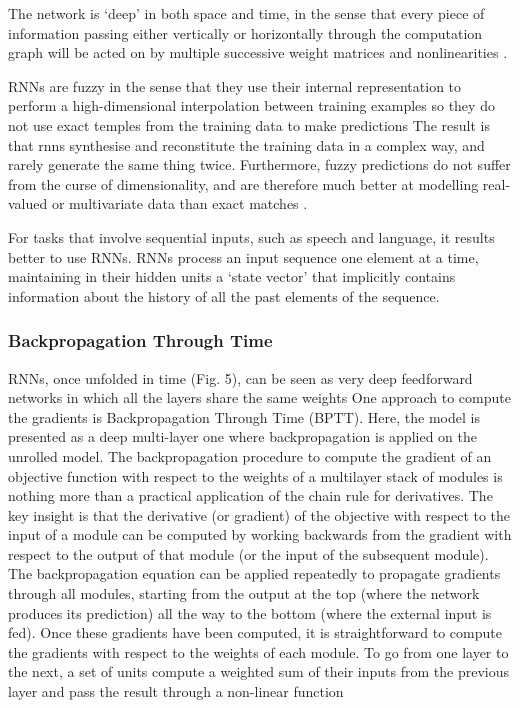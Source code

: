The network is `deep' in both space and time, in the sense that every piece of information passing either vertically or horizontally through the computation graph will be acted on by multiple successive weight matrices and nonlinearities \cite{graves2013generating}.

RNNs are fuzzy in the sense that they use their internal representation to perform a high-dimensional interpolation between training examples so they do not use exact temples from the training data to make predictions \cite{graves2013generating}
The result is that rnns synthesise and reconstitute the training data in a complex way, and rarely generate the same thing twice. Furthermore, fuzzy predictions do not suffer from the curse of dimensionality, and are therefore much better at modelling real-valued or multivariate data than exact matches  \cite{graves2013generating}.

For tasks that involve sequential inputs, such as speech and language, it results better to use RNNs. RNNs process an input sequence one element at a time, maintaining in their hidden units a ‘state vector’ that implicitly contains information about the history of all the past elements of the sequence.\cite{lecun2015deep}


\subsubsection{Backpropagation Through Time}

RNNs, once unfolded in time (Fig. 5), can be seen as very deep feedforward networks in which all the layers share the same weights\cite{lecun2015deep}
One approach to compute the gradients is Backpropagation Through Time (BPTT). Here, the model is presented as a deep multi-layer one where backpropagation is applied on the unrolled model\cite{pascanu2013difficulty}.
The backpropagation procedure to compute the gradient of an objective function with respect to the weights of a multilayer stack of modules is nothing more than a practical application of the chain rule for derivatives. The key insight is that the derivative (or gradient)
of the objective with respect to the input of a module can be computed by working backwards from the gradient with respect to the output of that module (or the input of the subsequent module). The backpropagation equation can be applied repeatedly to propagate gradients through all modules, starting from the output at the top (where the network produces its prediction) all the way to the bottom (where the external input is fed). Once these gradients have been computed, it is straightforward to compute the gradients with respect to the weights of each module. To go from one layer to the next, a set of units compute a weighted sum of their inputs from the previous layer and pass the result through a non-linear function \cite{lecun2015deep}

